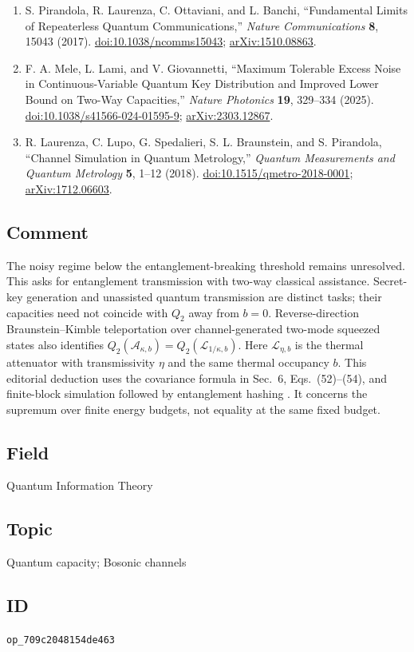 \begin{enumerate}[label={},leftmargin=4.8em,labelsep=0.5em]
  \footnotesize
  \item[\textup{[PLOB17]}]\label{ref:sc-plob}
  S. Pirandola, R. Laurenza, C. Ottaviani, and L. Banchi, ``Fundamental Limits of Repeaterless Quantum Communications,'' \emph{Nature Communications} \textbf{8}, 15043 (2017). \href{https://doi.org/10.1038/ncomms15043}{doi:10.1038/ncomms15043}; \href{https://arxiv.org/abs/1510.08863}{arXiv:1510.08863}.

  \item[\textup{[MLG25]}]\label{ref:sc-mele}
  F. A. Mele, L. Lami, and V. Giovannetti, ``Maximum Tolerable Excess Noise in Continuous-Variable Quantum Key Distribution and Improved Lower Bound on Two-Way Capacities,'' \emph{Nature Photonics} \textbf{19}, 329--334 (2025). \href{https://doi.org/10.1038/s41566-024-01595-9}{doi:10.1038/s41566-024-01595-9}; \href{https://arxiv.org/abs/2303.12867}{arXiv:2303.12867}.

  \item[\textup{[LLSBP18]}]\label{ref:sc-bk}
  R. Laurenza, C. Lupo, G. Spedalieri, S. L. Braunstein, and S. Pirandola, ``Channel Simulation in Quantum Metrology,'' \emph{Quantum Measurements and Quantum Metrology} \textbf{5}, 1--12 (2018). \href{https://doi.org/10.1515/qmetro-2018-0001}{doi:10.1515/qmetro-2018-0001}; \href{https://arxiv.org/abs/1712.06603}{arXiv:1712.06603}.
\end{enumerate}

\subsection*{Comment}

The noisy regime below the entanglement-breaking threshold remains unresolved. This asks for entanglement transmission with two-way classical assistance. Secret-key generation and unassisted quantum transmission are distinct tasks; their capacities need not coincide with $Q_2$ away from $b=0$. Reverse-direction Braunstein--Kimble teleportation over channel-generated two-mode squeezed states also identifies $Q_2(\mathcal A_{\kappa,b})=Q_2(\mathcal L_{1/\kappa,b})$. Here $\mathcal L_{\eta,b}$ is the thermal attenuator with transmissivity $\eta$ and the same thermal occupancy $b$. This editorial deduction uses the covariance formula in Sec.~6, Eqs.~(52)--(54), and finite-block simulation followed by entanglement hashing . It concerns the supremum over finite energy budgets, not equality at the same fixed budget.

\subsection*{Field}

Quantum Information Theory

\subsection*{Topic}

Quantum capacity; Bosonic channels

\subsection*{ID}

\texttt{op\_709c2048154de463}
